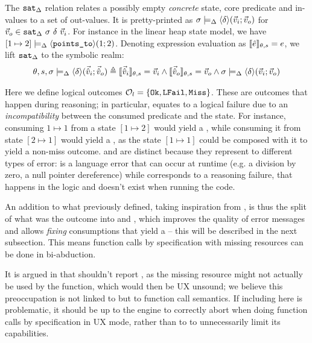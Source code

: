 The $\texttt{sat}_{\Delta}$ relation relates a possibly empty \emph{concrete} state, core predicate and in-values to a set of out-values. It is pretty-printed as $\sigma \models_{\Delta} \left<\delta\right>\!(\vec{v}_i;\vec{v}_o)$ for $\vec{v}_o \in \texttt{sat}_{\Delta}~\sigma~\delta~\vec{v}_i$. For instance in the linear heap state model, we have $[ 1 \mapsto 2 ] \models_{\Delta} \left<\texttt{points\_to}\right>\!(1;2)$. Denoting expression evaluation as $\llbracket\hat{e}\rrbracket_{\theta,s}=e$, we lift $\texttt{sat}_{\Delta}$ to the symbolic realm:
\begin{align*}
	\theta,s,\sigma\models_{\Delta} \left<\delta\right>\!(\vec{\hat{v}}_i;\vec{\hat{v}}_o) \triangleq \llbracket\vec{\hat{v}}_i\rrbracket_{\theta,s}=\vec{v}_i \land \llbracket\vec{\hat{v}}_o\rrbracket_{\theta,s}=\vec{v}_o \land \sigma\models_{\Delta} \left<\delta\right>\!(\vec{v}_i;\vec{v}_o)
\end{align*}

Here we define logical outcomes ${\cal O}_l = \{\texttt{Ok}, \texttt{LFail}, \texttt{Miss} \}$. These are outcomes that happen during reasoning; in particular, \LFail{} equates to a logical failure due to an \emph{incompatibility} between the consumed predicate and the state. For instance, consuming $1 \mapsto 1$ from a state $[1 \mapsto 2]$ would yield a \LFail{}, while consuming it from state $[2 \mapsto 1]$ would yield a \Miss{}, as the state $[1\mapsto 1]$ could be composed with it to yield a non-miss outcome. \Err{} and \LFail{} are distinct because they represent to different types of error: \Err{} is a language error that can occur at runtime (e.g. a division by zero, a null pointer dereference) while \LFail{} corresponds to a reasoning failure, that happens in the logic and doesn't exist when running the code.

An addition to what \cite{cse2} previously defined, taking inspiration from \cite{sacha-phd}, is thus the split of what was the  outcome into \LFail{} and \Miss{}, which improves the quality of error messages and allows \emph{fixing} consumptions that yield a \Miss{} -- this will be described in the next subsection. This means function calls by specification with missing resources can be done in bi-abduction.

\begin{remark}
	It is argued in \cite{cse1} that \consume{} shouldn't report \Miss, as the missing resource might not actually be used by the function, which would then be UX unsound; we believe this preoccupation is not linked to \consume{} but to function call semantics. If including \Miss{} here is problematic, it should be up to the engine to correctly abort when doing function calls by specification in UX mode, rather than to \consume{} to unnecessarily limit its capabilities.
\end{remark}

